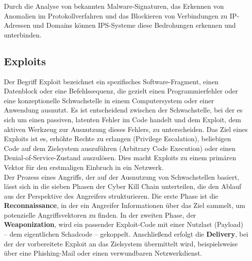 Durch die Analyse von bekannten Malware-Signaturen, das Erkennen von Anomalien im Protokollverfahren und das Blockieren von Verbindungen zu IP-Adressen und Domains können IPS-Systeme diese Bedrohungen erkennen und unterbinden.
\newpage


\subsection{Exploits}
Der Begriff Exploit bezeichnet ein spezifisches Software-Fragment, einen Datenblock oder eine Befehlssequenz, die gezielt einen Programmierfehler oder eine konzeptionelle Schwachstelle in einem Computersystem oder einer Anwendung ausnutzt. Es ist entscheidend zwischen der Schwachstelle, bei der es sich um einen passiven, latenten Fehler im Code handelt und dem Exploit, dem aktiven Werkzeug zur Ausnutzung dieses Fehlers, zu unterscheiden. Das Ziel eines Exploits ist es, erhöhte Rechte zu erlangen (Privilege Escalation), beliebigen Code auf dem Zielsystem auszuführen (Arbitrary Code Execution) oder einen Denial-of-Service-Zustand auszulösen. Dies macht Exploits zu einem primären Vektor für den erstmaligen Einbruch in ein Netzwerk.\cite{wik12}\\

Der Prozess eines Angriffs, der auf der Ausnutzung von Schwachstellen basiert, lässt sich in die sieben Phasen der Cyber Kill Chain unterteilen, die den Ablauf aus der Perspektive des Angreifers strukturieren. Die erste Phase ist die \textbf{Reconnaissance}, in der ein Angreifer Informationen über das Ziel sammelt, um potenzielle Angriffsvektoren zu finden. In der zweiten Phase, der \textbf{Weaponization}, wird ein passender Exploit-Code mit einer Nutzlast (Payload) – dem eigentlichen Schadcode – gekoppelt. Anschließend erfolgt die \textbf{Delivery}, bei der der vorbereitete Exploit an das Zielsystem übermittelt wird, beispielsweise über eine Phishing-Mail oder einen verwundbaren Netzwerkdienst.\\

